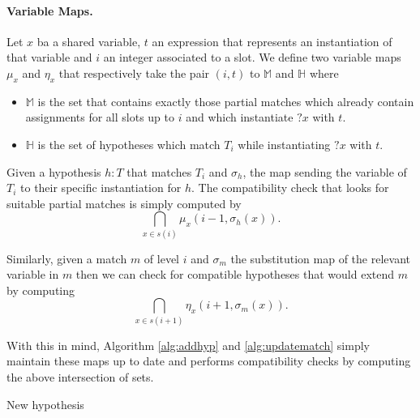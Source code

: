 \documentclass[runningheads]{llncs}
\begin{document}
\paragraph{Variable Maps.}
Let $x$ ba a shared variable, $t$ an expression that represents an instantiation of that variable and $i$ an integer associated to a slot.
We define two variable maps $\mu_x$ and $\eta_x$ that respectively take the pair $(i,t)$ to $\mathbb{M}$ and $\mathbb{H}$ where
\begin{itemize}
  \item $\mathbb{M}$ is the set that contains exactly those partial matches which already contain assignments for all slots up to $i$ and which instantiate $?x$ with $t$.
  \item $\mathbb{H}$ is the set of hypotheses which match $T_i$ while instantiating $?x$ with $t$.
\end{itemize}

Given a hypothesis $h : T$ that matches $T_i$ and $\sigma_h$, the map sending the variable of $T_i$ to their specific instantiation for $h$.
The compatibility check that looks for suitable partial matches is simply computed by
\[
  \bigcap_{x \in s(i)} \mu_x \left(i - 1, \sigma_h(x)\right).
\]

Similarly, given a match $m$ of level $i$ and $\sigma_m$ the substitution map of the relevant  variable in $m$ then we can check for compatible hypotheses that would extend $m$ by computing
\[
  \bigcap_{x \in s(i + 1)} \eta_x \left(i + 1, \sigma_m(x)\right).
\]

With this in mind, Algorithm \ref{alg:addhyp} and \ref{alg:updatematch} simply maintain these maps up to date and performs compatibility checks by computing the above intersection of sets.

\begin{algorithm}
    \caption{New hypothesis}\label{alg:addhyp}
\end{algorithm}
\end{document}
